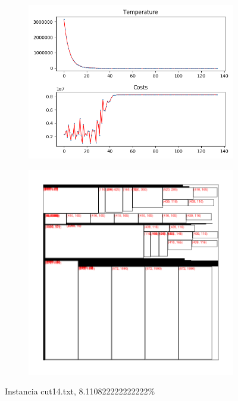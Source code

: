 \begin{figure}
\centering
\begin{subfigure}{.5\textwidth}
  \centering
  \includegraphics[width=1\linewidth]{results/cut14/3/plot}
  \label{fig:sub1}
\end{subfigure}%
\begin{subfigure}{.5\textwidth}
  \centering
  \includegraphics[width=1\linewidth]{results/cut14/3/cut}
  \label{fig:sub2}
\end{subfigure}
\caption{Instancia cut14.txt, 8.110822222222222\%}
\label{fig:test}
\end{figure}


